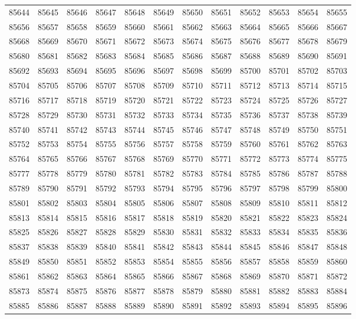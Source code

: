\begin{center}
\begin{longtable}{llllllllllll}
85644 &85645 &85646 &85647 &85648 &85649 &85650 &85651 &85652 &85653 &85654 &85655 \\
85656 &85657 &85658 &85659 &85660 &85661 &85662 &85663 &85664 &85665 &85666 &85667 \\
85668 &85669 &85670 &85671 &85672 &85673 &85674 &85675 &85676 &85677 &85678 &85679 \\
85680 &85681 &85682 &85683 &85684 &85685 &85686 &85687 &85688 &85689 &85690 &85691 \\
85692 &85693 &85694 &85695 &85696 &85697 &85698 &85699 &85700 &85701 &85702 &85703 \\
85704 &85705 &85706 &85707 &85708 &85709 &85710 &85711 &85712 &85713 &85714 &85715 \\
85716 &85717 &85718 &85719 &85720 &85721 &85722 &85723 &85724 &85725 &85726 &85727 \\
85728 &85729 &85730 &85731 &85732 &85733 &85734 &85735 &85736 &85737 &85738 &85739 \\
85740 &85741 &85742 &85743 &85744 &85745 &85746 &85747 &85748 &85749 &85750 &85751 \\
85752 &85753 &85754 &85755 &85756 &85757 &85758 &85759 &85760 &85761 &85762 &85763 \\
85764 &85765 &85766 &85767 &85768 &85769 &85770 &85771 &85772 &85773 &85774 &85775 \\
85777 &85778 &85779 &85780 &85781 &85782 &85783 &85784 &85785 &85786 &85787 &85788 \\
85789 &85790 &85791 &85792 &85793 &85794 &85795 &85796 &85797 &85798 &85799 &85800 \\
85801 &85802 &85803 &85804 &85805 &85806 &85807 &85808 &85809 &85810 &85811 &85812 \\
85813 &85814 &85815 &85816 &85817 &85818 &85819 &85820 &85821 &85822 &85823 &85824 \\
85825 &85826 &85827 &85828 &85829 &85830 &85831 &85832 &85833 &85834 &85835 &85836 \\
85837 &85838 &85839 &85840 &85841 &85842 &85843 &85844 &85845 &85846 &85847 &85848 \\
85849 &85850 &85851 &85852 &85853 &85854 &85855 &85856 &85857 &85858 &85859 &85860 \\
85861 &85862 &85863 &85864 &85865 &85866 &85867 &85868 &85869 &85870 &85871 &85872 \\
85873 &85874 &85875 &85876 &85877 &85878 &85879 &85880 &85881 &85882 &85883 &85884 \\
85885 &85886 &85887 &85888 &85889 &85890 &85891 &85892 &85893 &85894 &85895 &85896 \\

\end{longtable}
\end{center}
